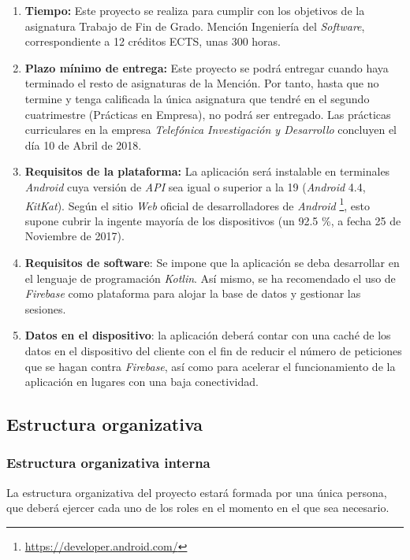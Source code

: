 \documentclass[twoside]{report}
\begin{document}
\begin{enumerate}
\item \textbf{Tiempo:} Este proyecto se realiza para cumplir con los objetivos de la asignatura Trabajo de Fin de Grado. Mención Ingeniería del \textit{Software}, correspondiente a 12 créditos ECTS, unas 300 horas.

\item \textbf{Plazo mínimo de entrega:} Este proyecto se podrá entregar cuando haya terminado el resto de asignaturas de la Mención. Por tanto, hasta que no termine y tenga calificada la única asignatura que tendré en el segundo cuatrimestre (Prácticas en Empresa), no podrá ser entregado. Las prácticas curriculares en la empresa \textit{Telefónica Investigación y Desarrollo} concluyen el día 10 de Abril de 2018.

\item \textbf{Requisitos de la plataforma:} La aplicación será instalable en terminales \textit{Android} cuya versión de \textit{API} sea igual o superior a la 19 (\textit{Android }4.4, \textit{KitKat}). Según el sitio \textit{Web} oficial de desarrolladores de \textit{Android} \footnote{\url{https://developer.android.com/}}, esto supone cubrir la ingente mayoría de los dispositivos (un 92.5 \%, a fecha 25 de Noviembre de 2017)\cite{androidversiondist}.

\item \textbf{Requisitos de software}: Se impone que la aplicación se deba desarrollar en el lenguaje de programación \textit{Kotlin}. Así mismo, se ha recomendado el uso de \textit{Firebase} como plataforma para alojar la base de datos y gestionar las sesiones.

\item \textbf{Datos en el dispositivo}: la aplicación deberá contar con una caché de los datos en el dispositivo del cliente con el fin de reducir el número de peticiones que se hagan contra \textit{Firebase}, así como para acelerar el funcionamiento de la aplicación en lugares con una baja conectividad.
\end{enumerate}

\subsection{Estructura organizativa}
\subsubsection{Estructura organizativa interna}
La estructura organizativa del proyecto estará formada por una única persona, que deberá ejercer cada uno de los roles en el momento en el que sea necesario. \cite{upedu} \vspace{0.5cm}
\end{document}
